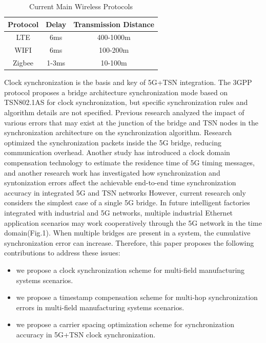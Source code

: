 \documentclass[english]{cccconf}
\begin{document}
\begin{table}[htbp]
	\caption{Current Main Wireless Protocols}
	\begin{center}
		\begin{tabular}{|c|c|c|}
			\hline
			\textbf{Protocol}& \textbf{Delay}& \textbf{Transmission Distance} \\
			\hline
			LTE
			& 6ms
			& 400-1000m \\
			\hline
			WIFI
			& 6ms
			& 100-200m \\
			\hline
			Zigbee
			& 1-3ms
			& 10-100m \\
			\hline		
		\end{tabular}
		\label{tab1}
	\end{center}
\end{table}
Clock synchronization is the basis and key of 5G+TSN integration. The 3GPP protocol proposes a bridge architecture synchronization mode based on TSN802.1AS for clock synchronization, but specific synchronization rules and algorithm details are not specified\cite{888888}. Previous research analyzed the impact of various errors that may exist at the junction of the bridge and TSN nodes in the synchronization architecture on the synchronization algorithm\cite{9527833}. Research\cite{9211936} optimized the synchronization packets inside the 5G bridge, reducing communication overhead. Another study has introduced a clock domain compensation technology to estimate the residence time of 5G timing messages\cite{9674640}, and another research work has investigated how synchronization and syntonization errors affect the achievable end-to-end time synchronization accuracy in integrated 5G and TSN networks However, current research only considers the simplest case of a single 5G bridge\cite{9557468}. In future intelligent factories integrated with industrial and 5G networks, multiple industrial Ethernet application scenarios may work cooperatively through the 5G network in the time domain\cite{8402373}(Fig.1). When multiple bridges are present in a system, the cumulative synchronization error can increase. Therefore, this paper proposes the following contributions to address these issues:
\begin{itemize}
	\item we propose a clock synchronization scheme for multi-field manufacturing systems scenarios.
	\item we propose a timestamp compensation scheme for multi-hop synchronization errors in multi-field manufacturing systems scenarios.
	\item we propose a carrier spacing optimization scheme for synchronization accuracy in 5G+TSN clock synchronization.
\end{itemize}
\end{document}
